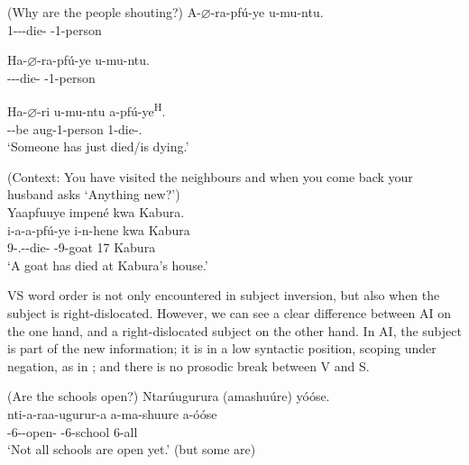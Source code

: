 \documentclass[output=paper]{langscibook}
\begin{document}
\ea
\label{bkm:Ref73950839}(Why are the people shouting?)
\ea
\gll
A-$\varnothing$-ra-pfú-ye  u-mu-ntu.\\
  1\SM-\PRS-\DJ-{}die-\PFV{}  \AUG{}-1-person\\
\glt

\ex
\label{bkm:Ref116983035}
\gll
Ha-$\varnothing$-ra-pfú-ye  u-mu-ntu.\\
  \EXP-\PRS-\DJ{}-die-\PFV{}  \AUG{}-1-person\\
\glt



\ex
\label{bkm:Ref116983036}
\gll
Ha-$\varnothing$-ri  u-mu-ntu  a-pfú-ye\textsuperscript{H}.\\
\EXP-\PRS{}-be  aug-1-person  1\SM-{}die-\PFV.\REL{}\\
\glt
  ‘Someone has just died/is dying.’\\

\z
\z


\ea
\label{bkm:Ref79132665}
(Context: You have visited the neighbours and when you come back your husband asks ‘Anything new?’)\\
Yaapfuuye impené kwa Kabura.\\
\gll
i-a-a-pfú-ye  i-n-hene  kwa  Kabura\\
9\SM{}-\N.\PST{}-\DJ{}-die-\PFV{}  \AUG{}-9-goat  17  Kabura\\
\glt
‘A goat has died at Kabura’s house.’\\

\z

VS word order is not only encountered in subject inversion, but also when the subject is right-dislocated. However, we can see a clear difference between AI on the one hand, and a right-dislocated subject on the other hand. In AI, the subject is part of the new information; it is in a low syntactic position, scoping under negation, as in ; and there is no prosodic break between V and S.

\ea
\label{bkm:Ref75349904}
(Are the schools open?)
Ntarúugurura (amashuúre) yóóse.\\
\gll
nti-a-raa-ugurur-a  a-ma-shuure  a-óóse\\
\NEG{}-6\SM{}-\INCP{}-open-\FV{}  \AUG{}-6-school  6-all\\
\glt
‘Not all schools are open yet.’ (but some are)\\
\end{document}
